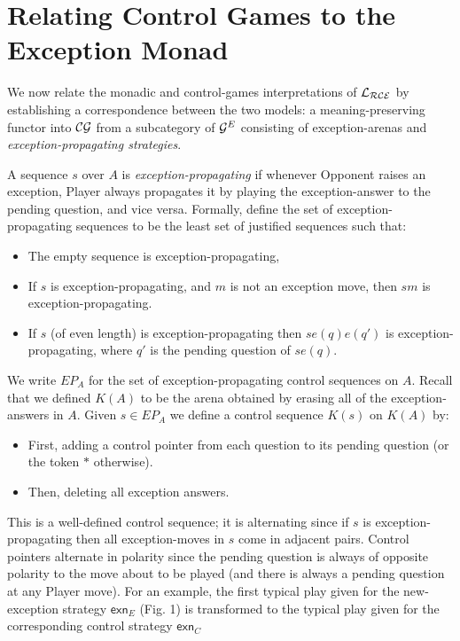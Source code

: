 \documentclass{eptcs}
\def\G{{\cal{G}}}
\newcommand{\CG}{{\cal{CG}}}
\newcommand{\Lce}{{\cal{L_{RCE}}}}
\newcommand{\xcell}{{\mathsf{exn}}}
\begin{document}
{\section{Relating Control Games to the Exception Monad} 
We now relate the monadic and  control-games interpretations of $\Lce$ by  establishing a correspondence between the two models: a meaning-preserving functor into $\CG$ from a subcategory of  $\G^E$ consisting of exception-arenas and \emph{exception-propagating strategies}. 

 A sequence $s$ over $A$ is \emph{exception-propagating} if whenever Opponent raises an exception, Player always propagates it by playing the exception-answer to the pending question, and vice versa. Formally, define the set of exception-propagating sequences to be the least set of justified sequences such that:
\begin{itemize}
\item The empty sequence is exception-propagating, 
\item If $s$ is exception-propagating, and $m$ is not an exception move, then $sm$ is exception-propagating.
\item If $s$ (of even length) is exception-propagating then $se(q)e(q')$ is exception-propagating, where $q'$ is the pending question of $se(q)$.
\end{itemize}
 We write $EP_A$ for the set of exception-propagating control sequences on $A$.
 Recall that we defined  $K(A)$ to be the arena obtained by erasing all of the exception-answers in $A$. Given $s \in EP_A$ we define a control sequence $K(s)$ on $K(A)$ by:
\begin{itemize}
\item First, adding a control pointer from each question to its  pending question (or the token $*$ otherwise).
\item Then, deleting all exception answers.   
\end{itemize}
This is a well-defined control sequence; it is alternating since if $s$ is exception-propagating then all exception-moves  in $s$ come in adjacent pairs. Control pointers alternate in polarity  since the pending question is always of opposite polarity to the move about to be played (and there is always a pending question at any Player move). For an example, the first typical play given for the  new-exception strategy $\xcell_E$ (Fig. 1) is transformed to the typical play given for the corresponding control strategy $\xcell_C$  


}
\end{document}
